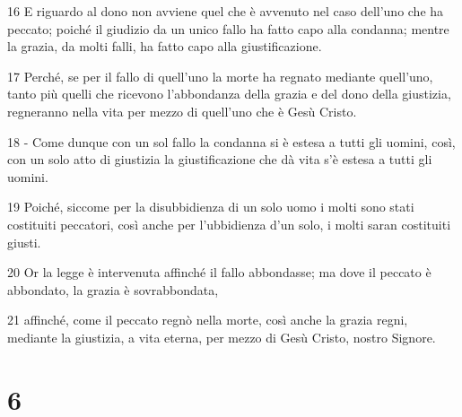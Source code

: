 \par 16 E riguardo al dono non avviene quel che è avvenuto nel caso dell'uno che ha peccato; poiché il giudizio da un unico fallo ha fatto capo alla condanna; mentre la grazia, da molti falli, ha fatto capo alla giustificazione.
\par 17 Perché, se per il fallo di quell'uno la morte ha regnato mediante quell'uno, tanto più quelli che ricevono l'abbondanza della grazia e del dono della giustizia, regneranno nella vita per mezzo di quell'uno che è Gesù Cristo.
\par 18 - Come dunque con un sol fallo la condanna si è estesa a tutti gli uomini, così, con un solo atto di giustizia la giustificazione che dà vita s'è estesa a tutti gli uomini.
\par 19 Poiché, siccome per la disubbidienza di un solo uomo i molti sono stati costituiti peccatori, così anche per l'ubbidienza d'un solo, i molti saran costituiti giusti.
\par 20 Or la legge è intervenuta affinché il fallo abbondasse; ma dove il peccato è abbondato, la grazia è sovrabbondata,
\par 21 affinché, come il peccato regnò nella morte, così anche la grazia regni, mediante la giustizia, a vita eterna, per mezzo di Gesù Cristo, nostro Signore.

\chapter{6}

